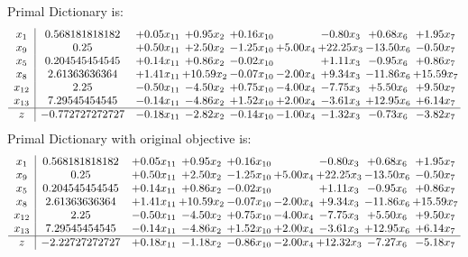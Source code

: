\documentclass[8pt]{article}
\begin{document}
Primal Dictionary is:
\[\begin{array}{c| c c@{\hskip 2pt} c@{\hskip 2pt} c@{\hskip 2pt} c@{\hskip 2pt} c@{\hskip 2pt} c@{\hskip 2pt} c@{\hskip 2pt} }
 x_{1}   &  0.568181818182 & +  0.05 x_{11} & +  0.95 x_{2} & +  0.16 x_{10} &   & -0.80 x_{3} & +  0.68 x_{6} & +  1.95 x_{7}\\
 x_{9}   &  0.25 & +  0.50 x_{11} & +  2.50 x_{2} & -1.25 x_{10} & +  5.00 x_{4} & + 22.25 x_{3} & -13.50 x_{6} & -0.50 x_{7}\\
 x_{5}   &  0.204545454545 & +  0.14 x_{11} & +  0.86 x_{2} & -0.02 x_{10} &   & +  1.11 x_{3} & -0.95 x_{6} & +  0.86 x_{7}\\
 x_{8}   &  2.61363636364 & +  1.41 x_{11} & + 10.59 x_{2} & -0.07 x_{10} & -2.00 x_{4} & +  9.34 x_{3} & -11.86 x_{6} & + 15.59 x_{7}\\
 x_{12}   &  2.25 & -0.50 x_{11} & -4.50 x_{2} & +  0.75 x_{10} & -4.00 x_{4} & -7.75 x_{3} & +  5.50 x_{6} & +  9.50 x_{7}\\
 x_{13}   &  7.29545454545 & -0.14 x_{11} & -4.86 x_{2} & +  1.52 x_{10} & +  2.00 x_{4} & -3.61 x_{3} & + 12.95 x_{6} & +  6.14 x_{7}\\
\hline
z    &  -0.772727272727 & -0.18 x_{11} & -2.82 x_{2} & -0.14 x_{10} & -1.00 x_{4} & -1.32 x_{3} & -0.73 x_{6} & -3.82 x_{7}\\
\end{array}\]
Primal Dictionary with original objective is:
\[\begin{array}{c| c c@{\hskip 2pt} c@{\hskip 2pt} c@{\hskip 2pt} c@{\hskip 2pt} c@{\hskip 2pt} c@{\hskip 2pt} c@{\hskip 2pt} }
 x_{1}   &  0.568181818182 & +  0.05 x_{11} & +  0.95 x_{2} & +  0.16 x_{10} &   & -0.80 x_{3} & +  0.68 x_{6} & +  1.95 x_{7}\\
 x_{9}   &  0.25 & +  0.50 x_{11} & +  2.50 x_{2} & -1.25 x_{10} & +  5.00 x_{4} & + 22.25 x_{3} & -13.50 x_{6} & -0.50 x_{7}\\
 x_{5}   &  0.204545454545 & +  0.14 x_{11} & +  0.86 x_{2} & -0.02 x_{10} &   & +  1.11 x_{3} & -0.95 x_{6} & +  0.86 x_{7}\\
 x_{8}   &  2.61363636364 & +  1.41 x_{11} & + 10.59 x_{2} & -0.07 x_{10} & -2.00 x_{4} & +  9.34 x_{3} & -11.86 x_{6} & + 15.59 x_{7}\\
 x_{12}   &  2.25 & -0.50 x_{11} & -4.50 x_{2} & +  0.75 x_{10} & -4.00 x_{4} & -7.75 x_{3} & +  5.50 x_{6} & +  9.50 x_{7}\\
 x_{13}   &  7.29545454545 & -0.14 x_{11} & -4.86 x_{2} & +  1.52 x_{10} & +  2.00 x_{4} & -3.61 x_{3} & + 12.95 x_{6} & +  6.14 x_{7}\\
\hline
z    &  -2.22727272727 & +  0.18 x_{11} & -1.18 x_{2} & -0.86 x_{10} & -2.00 x_{4} & + 12.32 x_{3} & -7.27 x_{6} & -5.18 x_{7}\\
\end{array}\]
\end{document}
